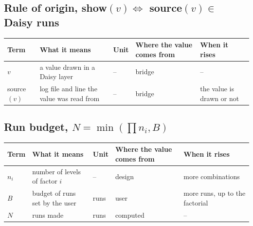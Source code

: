 \subsection*{Rule of origin, show$(v)\iff$ source$(v)\in$ Daisy runs}
{\small\begin{longtable}{>{\raggedright\arraybackslash}p{}>{\raggedright\arraybackslash}p{}>{\raggedright\arraybackslash}p{}>{\raggedright\arraybackslash}p{}>{\raggedright\arraybackslash}p{}}\toprule Term & What it means & Unit & Where the value comes from & When it rises\\\midrule\endhead
$v$ & a value drawn in a Daisy layer & -- & bridge & --\\
source$(v)$ & log file and line the value was read from & -- & bridge & the value is drawn or not\\
\bottomrule\end{longtable}}
\subsection*{Run budget, $N=\min(\prod n_i,B)$}
{\small\begin{longtable}{>{\raggedright\arraybackslash}p{}>{\raggedright\arraybackslash}p{}>{\raggedright\arraybackslash}p{}>{\raggedright\arraybackslash}p{}>{\raggedright\arraybackslash}p{}}\toprule Term & What it means & Unit & Where the value comes from & When it rises\\\midrule\endhead
$n_i$ & number of levels of factor $i$ & -- & design & more combinations\\
$B$ & budget of runs set by the user & runs & user & more runs, up to the factorial\\
$N$ & runs made & runs & computed & --\\
\bottomrule\end{longtable}}
